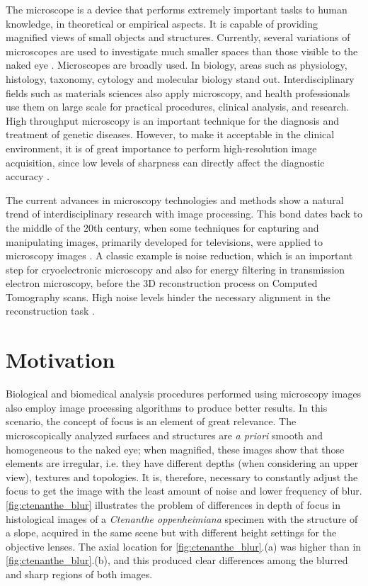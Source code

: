 The microscope is a device that performs extremely important tasks to human knowledge, in theoretical or empirical aspects. It is capable of providing magnified views of small objects and structures. Currently, several variations of microscopes are used to investigate much smaller spaces than those visible to the naked eye \cite{wu2008microscope}. Microscopes are broadly used. In biology, areas such as physiology, histology, taxonomy, cytology and molecular biology stand out. Interdisciplinary fields such as materials sciences also apply microscopy, and health professionals use them on large scale for practical procedures, clinical analysis, and research. High throughput microscopy is an important technique for the diagnosis and treatment of genetic diseases. However, to make it acceptable in the clinical environment, it is of great importance to perform high-resolution image acquisition, since low levels of sharpness can directly affect the diagnostic accuracy \cite{qiu2013evaluations}.

The current advances in microscopy technologies and methods show a natural trend of interdisciplinary research with image processing. This bond dates back to the middle of the 20th century, when some techniques for capturing and manipulating images, primarily developed for televisions, were applied to microscopy images \cite{wu2008microscope}. A classic example is noise reduction, which is an important step for cryoelectronic microscopy and also for energy filtering in transmission electron microscopy, before the 3D reconstruction process on Computed Tomography scans. High noise levels hinder the necessary alignment in the reconstruction task \cite{vyas2017multiscale}.

\section{Motivation}

Biological and biomedical analysis procedures performed using microscopy images also employ image processing algorithms to produce better results. In this scenario, the concept of focus is an element of great relevance. The microscopically analyzed surfaces and structures are \emph{a priori} smooth and homogeneous to the naked eye; when magnified, these images show that those elements are irregular, i.e. they have different depths (when considering an upper view), textures and topologies. It is, therefore, necessary to constantly adjust the focus to get the image with the least amount of noise and lower frequency of blur. \autoref{fig:ctenanthe_blur} illustrates the problem of differences in depth of focus in histological images of a \emph{Ctenanthe oppenheimiana} specimen with the structure of a slope, acquired in the same scene but with different height settings for the objective lenses. The axial location for \autoref{fig:ctenanthe_blur}.(a) was higher than in \autoref{fig:ctenanthe_blur}.(b), and this produced clear differences among the blurred and sharp regions of both images.

